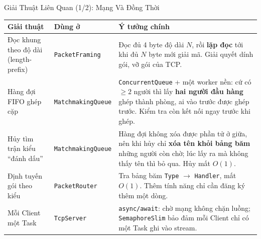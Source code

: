 \begin{frame}{Giải Thuật Liên Quan (1/2): Mạng Và Đồng Thời}
  \footnotesize
  \begin{tabularx}{\textwidth}{@{}l l Y@{}}
    \toprule \textbf{Giải thuật} & \textbf{Dùng ở} & \textbf{Ý tưởng chính} \\ \midrule
    Đọc khung theo độ dài (length-prefix) & \texttt{PacketFraming} &
      Đọc đủ 4 byte độ dài $N$, rồi \textbf{lặp đọc} tới khi đủ $N$ byte mới giải mã. Giải quyết dính gói, vỡ gói của TCP. \\
    Hàng đợi FIFO ghép cặp & \texttt{MatchmakingQueue} &
      \texttt{ConcurrentQueue} + một worker nền: cứ có $\ge 2$ người thì lấy \textbf{hai người đầu hàng} ghép thành phòng, ai vào trước được ghép trước. Kiểm tra còn kết nối ngay trước khi ghép. \\
    Hủy tìm trận kiểu ``đánh dấu'' & \texttt{MatchmakingQueue} &
      Hàng đợi không xóa được phần tử ở giữa, nên khi hủy chỉ \textbf{xóa tên khỏi bảng băm} những người còn chờ; lúc lấy ra mà không thấy tên thì bỏ qua. Hủy mất $O(1)$. \\
    Định tuyến gói theo kiểu & \texttt{PacketRouter} &
      Tra bảng băm \texttt{Type} $\rightarrow$ \texttt{Handler}, mất $O(1)$. Thêm tính năng chỉ cần đăng ký thêm một dòng. \\
    Mỗi Client một Task & \texttt{TcpServer} &
      \texttt{async/await}: chờ mạng không chặn luồng; \texttt{SemaphoreSlim} bảo đảm mỗi Client chỉ có một Task ghi vào stream. \\
    \bottomrule
  \end{tabularx}
\end{frame}

